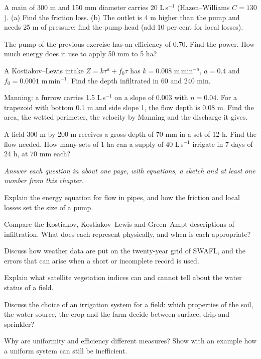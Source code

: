 \begin{exlist}
\item A main of 300 m and 150 mm diameter carries 20 L\,s$^{-1}$ (Hazen--Williams $C=130$). (a) Find the friction loss. (b) The outlet is 4 m higher than the pump and needs 25 m of pressure: find the pump head (add 10 per cent for local losses).
\item The pump of the previous exercise has an efficiency of 0.70. Find the power. How much energy does it use to apply 50 mm to 5 ha?
\item A Kostiakov--Lewis intake $Z=k\tau^a+f_0\tau$ has $k=0.008$ m\,min$^{-a}$, $a=0.4$ and $f_0=0.0001$ m\,min$^{-1}$. Find the depth infiltrated in 60 and 240 min.\exans{47.1 mm; 95.6 mm}
\item Manning: a furrow carries 1.5 L\,s$^{-1}$ on a slope of 0.003 with $n=0.04$. For a trapezoid with bottom 0.1 m and side slope 1, the flow depth is 0.08 m. Find the area, the wetted perimeter, the velocity by Manning and the discharge it gives.
\item A field 300 m by 200 m receives a gross depth of 70 mm in a set of 12 h. Find the flow needed. How many sets of 1 ha can a supply of 40 L\,s$^{-1}$ irrigate in 7 days of 24 h, at 70 mm each?
\end{exlist}
{\small\itshape Answer each question in about one page, with equations, a sketch and at least one number from this chapter.}\par\vspace{3pt}
\begin{exlist}
\item Explain the energy equation for flow in pipes, and how the friction and local losses set the size of a pump.
\item Compare the Kostiakov, Kostiakov--Lewis and Green--Ampt descriptions of infiltration. What does each represent physically, and when is each appropriate?
\item Discuss how weather data are put on the twenty-year grid of SWAFL, and the errors that can arise when a short or incomplete record is used.
\item Explain what satellite vegetation indices can and cannot tell about the water status of a field.
\item Discuss the choice of an irrigation system for a field: which properties of the soil, the water source, the crop and the farm decide between surface, drip and sprinkler?
\item Why are uniformity and efficiency different measures? Show with an example how a uniform system can still be inefficient.
\end{exlist}

